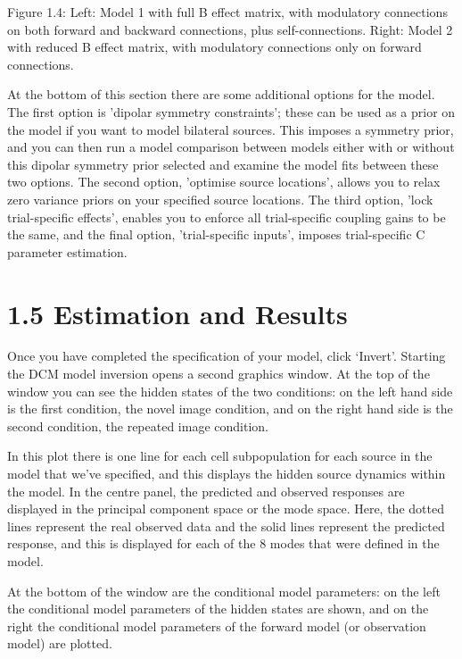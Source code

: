 Figure 1.4: Left: Model 1 with full B effect matrix, with modulatory
connections on both forward and backward connections, plus
self-connections. Right: Model 2 with reduced B effect matrix, with
modulatory connections only on forward connections.

At the bottom of this section there are some additional options for the
model. The first option is 'dipolar symmetry constraints'; these can be
used as a prior on the model if you want to model bilateral sources.
This imposes a symmetry prior, and you can then run a model comparison
between models either with or without this dipolar symmetry prior
selected and examine the model fits between these two options. The
second option, 'optimise source locations', allows you to relax zero
variance priors on your specified source locations. The third option,
'lock trial-specific effects', enables you to enforce all trial-specific
coupling gains to be the same, and the final option, 'trial-specific
inputs', imposes trial-specific C parameter estimation.

\section{\texorpdfstring{\textbf{1.5 Estimation and
Results}}{1.5 Estimation and Results}}\label{estimation-and-results}

Once you have completed the specification of your model, click `Invert'.
Starting the DCM model inversion opens a second graphics window. At the
top of the window you can see the hidden states of the two conditions:
on the left hand side is the first condition, the novel image condition,
and on the right hand side is the second condition, the repeated image
condition.

In this plot there is one line for each cell subpopulation for each
source in the model that we've specified, and this displays the hidden
source dynamics within the model. In the centre panel, the predicted and
observed responses are displayed in the principal component space or the
mode space. Here, the dotted lines represent the real observed data and
the solid lines represent the predicted response, and this is displayed
for each of the 8 modes that were defined in the model.

At the bottom of the window are the conditional model parameters: on the
left the conditional model parameters of the hidden states are shown,
and on the right the conditional model parameters of the forward model
(or observation model) are plotted.

